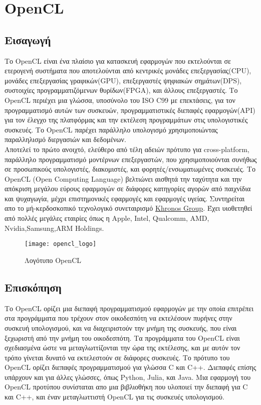 \section{OpenCL}
\subsection{Εισαγωγή}
Το OpenCL είναι ένα πλαίσιο για κατασκευή εφαρμογών που εκτελούνται σε ετερογενή συστήματα που αποτελούνται από κεντρικές μονάδες επεξεργασίας(CPU), μονάδες επεξεργασίας γραφικών(GPU), επεξεργαστές ψηφιακών σημάτων(DPS), συστοιχίες προγραμματιζόμενων θυρίδων(FPGA), και άλλους επεξεργαστές. Το OpenCL περιέχει μια γλώσσα, υποσύνολο του ISO C99 με επεκτάσεις, για τον προγραμματισμό αυτών των συσκευών, προγραμματιστικές διεπαφές εφαρμογών(API) για τον έλεγχο της πλατφόρμας και την εκτέλεση προγραμμάτων στις υπολογιστικές συσκευές. Το OpenCL παρέχει παράλληλο υπολογισμό χρησιμοποιώντας παραλληλισμό διεργασιών και δεδομένων.\\
Αποτελεί το πρώτο ανοιχτό, ελεύθερο από τέλη αδειών πρότυπο για cross-platform, παράλληλο προγραμματισμό μοντέρνων επεξεργαστών, που χρησιμοποιούνται συνήθως σε προσωπικούς υπολογιστές, διακομιστές, και φορητές/ενσωματωμένες συσκευές. Το OpenCL (Open Computing Language) βελτιώνει αισθητά την ταχύτητα και την απόκριση μεγάλου εύρους εφαρμογών σε διάφορες κατηγορίες αγορών από παιχνίδια και ψυχαγωγία, μέχρι επιστημονικές εφαρμογές και εφαρμογές υγείας. Συντηρείται απο το μή-κερδοσκοπικό τεχνολογικό συνεταιρισμό \href{http://www.khronos.org}{Khronos Group}. Έχει υιοθετηθεί από πολλές μεγάλες εταιρίες όπως η Apple, Intel, Qualcomm, AMD, Nvidia,Samsung,ARM Holdings.
\begin{figure}[h]
	\texttt{[image: opencl\_logo]}
	\centering
	\caption{Λογότυπο OpenCL}
\end{figure}
\subsection{Επισκόπηση}
Το OpenCL ορίζει μια διεπαφή προγραμματισμού εφαρμογών με την οποία επιτρέπει στα προγράμματα που τρέχουν στον οικοδεσπότη να εκτελέσουν πυρήνες στην συσκευή υπολογισμού, και να διαχειριστούν την μνήμη της συσκευής, που είναι ξεχωριστή από την μνήμη του οικοδεσπότη. Τα προγράμματα του OpenCL είναι σχεδιασμένα ώστε να μεταγλωττίζονται την ώρα της εκτέλεσης, και με αυτόν τον τρόπο γίνεται δυνατό να εκτελεστούν σε διάφορες συσκευές. Το πρότυπο του OpenCL ορίζει διεπαφές προγραμματισμού για γλώσσα C και C++. Διεπαφές επίσης υπάρχουν και για άλλες γλώσσες, όπως Python, Julia, και Java. Μια εφαρμογή του OpenCL προτύπου συνίσταται απο μια βιβλιοθήκη που υλοποιεί την διεπαφή για C και C++, και έναν μεταγλωττιστή OpenCL για τις συσκευές υπολογισμού.\\
